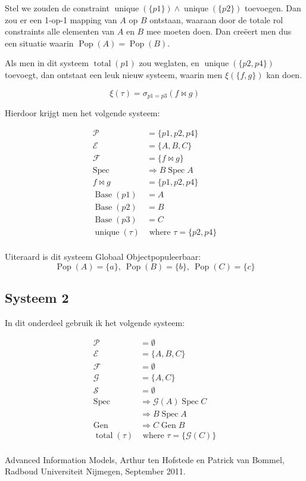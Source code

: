 \documentclass{article}
\newcommand{\Spec}{\ensuremath{\operatorname{Spec}}}
\newcommand{\Gen}{\ensuremath{\operatorname{Gen}}}
\newcommand{\Base}{\ensuremath{\operatorname{Base}}}
\newcommand{\total}{\ensuremath{\operatorname{total}}}
\newcommand{\unique}{\ensuremath{\operatorname{unique}}}
\newcommand{\Pop}{\ensuremath{\operatorname{Pop}}}
\begin{document}
Stel we zouden de constraint $\operatorname{unique}(\{p1\}) \wedge
\operatorname{unique}(\{p2\})$ toevoegen. Dan zou er een 1-op-1 mapping van $A$
op $B$ ontstaan, waaraan door de totale rol constraints alle elementen van $A$
en $B$ mee moeten doen. Dan creëert men dus een situatie waarin
$\operatorname{Pop}(A)=\operatorname{Pop}(B)$.

Als men in dit systeem $\total (p1)$ zou weglaten, en $\operatorname{unique}
(\{p2,p4\})$ toevoegt, dan ontstaat een leuk nieuw systeem, waarin men $\xi
(\{f,g\})$ kan doen. 

\[
  \xi (\tau) = \sigma_{p1=p3} (f \bowtie g)
\]

Hierdoor krijgt men het volgende systeem:

\begin{align*}
  \mathcal{P} & = \{p1,p2,p4\}    \\
  \mathcal{E} & = \{A,B,C\}       \\
  \mathcal{F} & =  \{f\bowtie g\} \\
  \Spec &\Rightarrow B \Spec A    \\
  f \bowtie g & = \{p1,p2,p4\}    \\
  \Base (p1)  & = A               \\
  \Base (p2)  & = B               \\
  \Base (p3)  & = C               \\
  \unique (\tau) &\text{ where } \tau = \{p2,p4\} \\
\end{align*}

Uiteraard is dit systeem Globaal Objectpopuleerbaar: 
\[ \Pop (A) = \{a\},\  \Pop (B) = \{b\},\  \Pop (C)= \{c\} \]

\subsection{Systeem 2}

In dit onderdeel gebruik ik het volgende systeem: 

\begin{align*}
  \mathcal{P}   & = \emptyset                               \\
  \mathcal{E}   & = \{A, B, C\}                             \\
  \mathcal{F}   & = \emptyset                               \\
  \mathcal{G}   & = \{A, C\}                                \\
  \mathcal{S}   & = \emptyset                               \\
  \Spec         & \Rightarrow \mathcal{G} (A) \Spec C       \\
                & \Rightarrow B \Spec A                     \\
  \Gen          & \Rightarrow C \Gen B                      \\
  \total (\tau) & \text{ where } \tau = \{\mathcal{G} (C)\} \\
\end{align*}



\begin{thebibliography}{9}
    Advanced Information Models, 
    Arthur ten Hofstede en Patrick van Bommel,
    Radboud Universiteit Nijmegen,
    September 2011.
\end{thebibliography}
\end{document}
